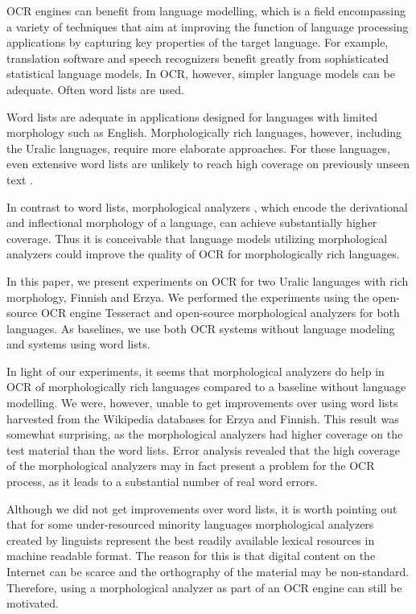 \documentclass[b5paper]{article}
\begin{document}
OCR engines can benefit from language modelling, which is a field
encompassing a variety of techniques that aim at improving the
function of language processing applications by capturing key
properties of the target language. For example, translation software
and speech recognizers benefit greatly from sophisticated statistical
language models. In OCR, however, simpler language models can be
adequate. Often word lists are used.

Word lists are adequate in applications designed for languages with
limited morphology such as English. Morphologically rich
languages, however, including the Uralic languages, require more elaborate
approaches. For these languages, even extensive word lists are
unlikely to reach high coverage on previously unseen text \cite{creutz07}.

In contrast to word lists, morphological analyzers
\cite{koskenniemi83}, which encode the derivational and inflectional
morphology of a language, can achieve substantially higher
coverage. Thus it is conceivable that language models utilizing
morphological analyzers could improve the quality of OCR for
morphologically rich languages.

In this paper, we present experiments on OCR for two Uralic languages
with rich morphology, Finnish and Erzya. We performed the experiments
using the open-source OCR engine Tesseract \cite{smith07} and
open-source morphological analyzers for both languages. As baselines,
we use both OCR systems without language modeling and systems using
word lists.

In light of our experiments, it seems that morphological analyzers do
help in OCR of morphologically rich languages compared to a baseline
without language modelling. We were, however, unable to get improvements
over using word lists harvested from the Wikipedia databases for Erzya
and Finnish. This result was somewhat surprising, as the morphological
analyzers had higher coverage on the test material than the word
lists. Error analysis revealed that the high coverage of the
morphological analyzers may in fact present a problem for the OCR
process, as it leads to a substantial number of real word errors.

Although we did not get improvements over word lists, it is worth
pointing out that for some under-resourced minority languages
morphological analyzers created by linguists represent the best
readily available lexical resources in machine readable format. The
reason for this is that digital content on the Internet can be scarce
and the orthography of the material may be non-standard. Therefore,
using a morphological analyzer as part of an OCR engine can still be
motivated.
\end{document}
